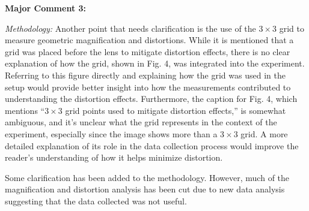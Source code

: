 \documentclass[%
 aip,
cp,  %
 amsmath,amssymb,
 reprint,%
]{revtex4-2}
\begin{document}
        \begin{mdframed} \textbf{Major Comment 3:} 

            \textit{Methodology:} 
            Another point that needs clarification is the use of the $3\times3$ grid to measure geometric magnification and distortions. While it is mentioned that a grid was placed before the lens to mitigate distortion effects, there is no clear explanation of how the grid, shown in Fig. 4, was integrated into the experiment. Referring to this figure directly and explaining how the grid was used in the setup would provide better insight into how the measurements contributed to understanding the distortion effects. Furthermore, the caption for Fig. 4, which mentions ``$3\times3$ grid points used to mitigate distortion effects,'' is somewhat ambiguous, and it's unclear what the grid represents in the context of the experiment, especially since the image shows more than a $3\times3$ grid. A more detailed explanation of its role in the data collection process would improve the reader's understanding of how it helps minimize distortion.
        \end{mdframed}
        {\color{red}
        
            Some clarification has been added to the methodology. However, much of the magnification and distortion analysis has been cut due to new data analysis suggesting that the data collected was not useful.

        }
\end{document}
